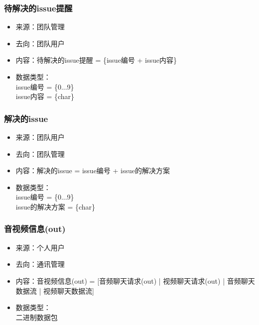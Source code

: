 {            \subsubsection{\color{red} 待解决的issue提醒}
            \begin{itemize}
            \item 来源：团队管理
            \item 去向：团队用户
            \item 内容：待解决的issue提醒 = \{issue编号 + issue内容\} 
            \item 数据类型：\\
            issue编号 = \{0...9\}\\
            issue内容 = \{char\}\\
            \end{itemize}
            
            \subsubsection{\color{red} 解决的issue}
            \begin{itemize}
            \item 来源：团队用户
            \item 去向：团队管理
            \item 内容：解决的issue = issue编号 + issue的解决方案
            \item 数据类型：\\
            issue编号 = \{0...9\}\\
            issue的解决方案 = \{char\}\\
            \end{itemize}
            }


            \subsubsection{音视频信息(out)}
            \begin{itemize}
                \item 来源：个人用户
                \item 去向：通讯管理
                \item 内容：音视频信息(out) = [音频聊天请求(out) | 视频聊天请求(out) | 音频聊天数据流 | 视频聊天数据流]
                \item 数据类型：\\
                    二进制数据包\\
            \end{itemize}
